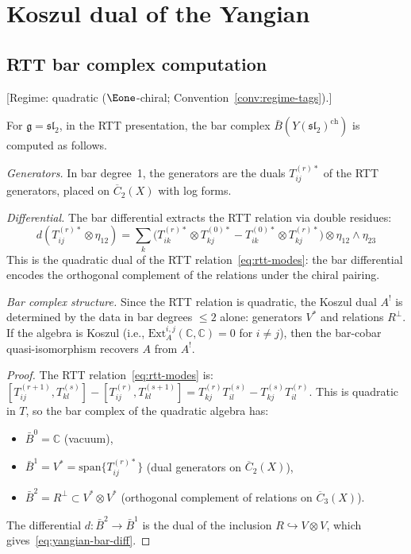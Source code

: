 \section{Koszul dual of the Yangian}\label{sec:yangian-koszul}

\subsection{RTT bar complex computation}

\begin{theorem}\label{thm:yangian-bar-rtt}
\textup{[Regime: quadratic \textup{(}$\Eone$-chiral;
Convention~\textup{\ref{conv:regime-tags})}.]}

For $\mathfrak{g} = \mathfrak{sl}_2$, in the RTT presentation, the bar complex $\bar{B}(Y(\mathfrak{sl}_2)^{\mathrm{ch}})$ is computed as follows.

\emph{Generators.} In bar degree~1, the generators are the duals $T_{ij}^{(r)*}$ of the RTT generators, placed on $\overline{C}_2(X)$ with log forms.

\emph{Differential.} The bar differential extracts the RTT relation via double residues:
\begin{equation}\label{eq:yangian-bar-diff}
d(T_{ij}^{(r)*} \otimes \eta_{12}) = \sum_{k} \bigl(T_{ik}^{(r)*} \otimes T_{kj}^{(0)*} - T_{ik}^{(0)*} \otimes T_{kj}^{(r)*}\bigr) \otimes \eta_{12} \wedge \eta_{23}
\end{equation}
This is the quadratic dual of the RTT relation~\eqref{eq:rtt-modes}: the bar differential encodes the orthogonal complement of the relations under the chiral pairing.

\emph{Bar complex structure.} Since the RTT relation is quadratic, the Koszul dual $A^!$ is determined by the data in bar degrees $\leq 2$ alone: generators $V^*$ and relations $R^\perp$.  If the algebra is Koszul (i.e., $\mathrm{Ext}^{i,j}_A(\mathbb{C}, \mathbb{C}) = 0$ for $i \neq j$), then the bar-cobar quasi-isomorphism recovers $A$ from $A^!$.
\end{theorem}

\begin{proof}
The RTT relation~\eqref{eq:rtt-modes} is:
$[T_{ij}^{(r+1)}, T_{kl}^{(s)}] - [T_{ij}^{(r)}, T_{kl}^{(s+1)}] = T_{kj}^{(r)} T_{il}^{(s)} - T_{kj}^{(s)} T_{il}^{(r)}$.
This is quadratic in $T$, so the bar complex of the quadratic algebra has:
\begin{itemize}
\item $\bar{B}^0 = \mathbb{C}$ (vacuum),
\item $\bar{B}^1 = V^* = \mathrm{span}\{T_{ij}^{(r)*}\}$ (dual generators on $\overline{C}_2(X)$),
\item $\bar{B}^2 = R^\perp \subset V^* \otimes V^*$ (orthogonal complement of relations on $\overline{C}_3(X)$).
\end{itemize}
The differential $d\colon \bar{B}^2 \to \bar{B}^1$ is the dual of the inclusion $R \hookrightarrow V \otimes V$, which gives~\eqref{eq:yangian-bar-diff}.
\end{proof}

